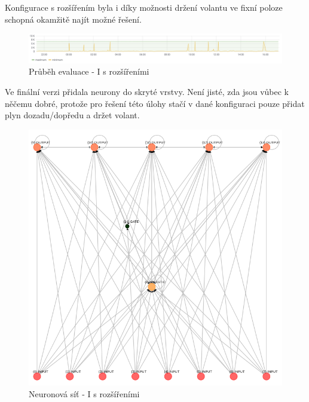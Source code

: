Konfigurace s rozšířením byla i díky možnosti držení volantu ve fixní poloze schopná okamžitě najít možné řešení.
\begin{figure}[H]
	\centering
	\includegraphics[width=1.0\linewidth]{solutions/Ibasic/advancedGraph}
	\caption{Průběh evaluace - I s rozšířeními}
	\label{fig:IbasicAdvancedGraph}
\end{figure}
Ve finální verzi přidala neurony do skryté vrstvy. Není jisté, zda jsou vůbec k něčemu dobré, protože pro řešení této úlohy stačí v dané konfiguraci pouze přidat plyn dozadu/dopředu a držet volant.
\begin{figure}[H]
	\centering
	\includegraphics[width=0.6\linewidth]{solutions/Ibasic/advanced}
	\caption{Neuronová síť - I s rozšířeními}
	\label{fig:basicAdvanced}
\end{figure}

